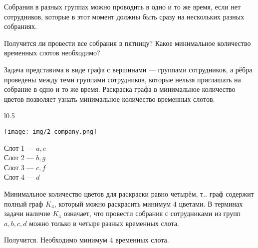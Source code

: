 \documentclass[a4paper,12pt]{article}
\begin{document}
Собрания в разных группах можно проводить в одно и то же время, если нет сотрудников, которые в этот момент должны быть сразу на нескольких разных собраниях.

Получится ли провести все собрания в пятницу? Какое минимальное количество временных слотов необходимо? \par
\vspace{5pt}
 Задача представима в виде графа с вершинами --- группами сотрудников, а рёбра проведены между теми группами сотрудников, которые нельзя приглашать на собрание в одно и то же время. Раскраска графа в минимальное количество цветов позволяет узнать минимальное количество временных слотов.\par
\vspace{15pt}
\begin{wrapfigure}[4]{l}{0.5\linewidth} 
\vspace{-35pt}
\begin{center}
\texttt{[image: img/2\_company.png]}
\end{center}
\end{wrapfigure}
\noindent
Слот 1 --- $a, e$ \\
Слот 2 --- $b, g$ \\
Слот 3 --- $c, f$ \\
Слот 4 --- $d$ \par
Минимальное количество цветов для раскраски равно четырём, т.. граф содержит полный граф $K_4$, который можно раскрасить минимум $4$ цветами. В терминах задачи наличие $K_4$ означает, что провести собрания с сотрудниками из групп $a,b,c,d$ можно только в четыре разных временных слота.\par
{} Получится. Необходимо минимум $4$ временных слота.
\end{document}
